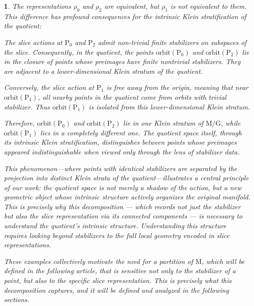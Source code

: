 \documentclass[10pt,reqno,letterpaper,twoside]{amsart}
\theoremstyle{article}
\newtheorem{article}{}
\def \G{\mathrm G}
\def \M{\mathrm M}
\def \P{\mathrm P}
\newcommand{\orbit}{{\mathrm{orbit}}}
\begin{document}
\begin{article}
    The representations $\rho_0$ and $\rho_2$ are equivalent,
    but $\rho_1$ is not equivalent to them.
    This difference has profound consequences for the intrinsic Klein stratification of the quotient:
    
    The slice actions at $\P_0$ and $\P_2$ admit non-trivial finite stabilizers on subspaces of the slice.
    Consequently,
    in the quotient,
    the points $\orbit(\P_0)$ and $\orbit(\P_2)$ lie in the closure of points whose preimages have finite nontrivial stabilizers.
    They are adjacent to a lower-dimensional Klein stratum of the quotient.
    
    Conversely,
    the slice action at $\P_1$ is free away from the origin, meaning that near $\orbit(\P_1)$,
    all nearby points in the quotient come from orbits with trivial stabilizer.
    Thus $\orbit(\P_1)$ is isolated from this lower-dimensional Klein stratum.
    
    Therefore,
    $\orbit(\P_0)$ and $\orbit(\P_2)$ lie in one Klein stratum of $\M/\G$,
    while $\orbit(\P_1)$ lies in a completely different one.
    The quotient space itself,
    through its intrinsic Klein stratification,
    distinguishes between points whose preimages appeared indistinguishable when viewed only through the lens of stabilizer data.
    
    This phenomenon—where points with identical stabilizers are separated by the projection into distinct Klein strata of the quotient—illustrates a central principle of our work:
    the quotient space is not merely a shadow of the action, but a new geometric object whose intrinsic structure actively organizes the original manifold.
    This is precisely why this decomposition — which records not just the stabilizer but also the slice representation via its connected components — is necessary to understand the quotient's intrinsic structure.
    Understanding this structure requires looking beyond stabilizers to the full local geometry encoded in slice representations.
    
    These examples collectively motivate the need for a partition of $\M$,
    which will be defined in the following article,
    that is sensitive not only to the stabilizer of a point,
    but also to the specific slice representation.
    This is precisely what this decomposition captures,
    and it will be defined and analyzed in the following sections.
    
  \end{article}
  
\end{document}
